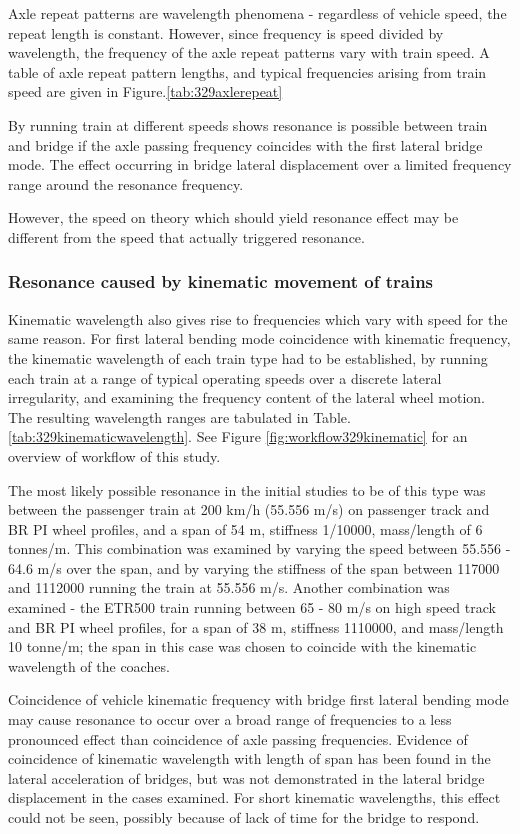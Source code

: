 Axle repeat patterns are wavelength phenomena - regardless of vehicle speed, the repeat length is constant. However, since frequency is speed divided by wavelength, the frequency of the axle repeat patterns vary with train speed. A table of axle repeat pattern lengths, and typical frequencies arising from train speed are given in Figure.\ref{tab:329axlerepeat}

By running train at different speeds shows resonance is possible between train and bridge if the axle passing frequency coincides with the first lateral bridge mode. The effect occurring in bridge lateral displacement over a limited frequency range around the resonance frequency.


However, the speed on theory which should yield resonance effect may be different from the speed that actually triggered resonance.

\subsubsection{Resonance caused by kinematic movement of trains} 
Kinematic wavelength also gives rise to frequencies which vary with speed for the same reason. For first lateral bending mode coincidence with kinematic frequency, the kinematic wavelength of each train type had to be established, by running each train at a range of typical operating speeds over a discrete lateral irregularity, and examining the frequency content of the lateral wheel motion. The resulting wavelength ranges are tabulated in Table.\ref{tab:329kinematicwavelength}. See Figure \ref{fig:workflow329kinematic} for an overview of workflow of this study.

The most likely possible resonance in the initial studies to be of this type was between the passenger train at 200 km/h (55.556 m/s) on passenger track and BR PI wheel profiles, and a span of 54 m, stiffness 1/10000, mass/length of 6 tonnes/m. This combination was examined by varying the speed between 55.556 - 64.6 m/s over the span, and by varying the stiffness of the span between 117000 and 1112000 running the train at 55.556 m/s. Another combination was examined - the ETR500 train running between 65 - 80 m/s on high speed track and BR PI wheel profiles, for a span of 38 m, stiffness 1110000, and mass/length 10 tonne/m; the span in this case was chosen to coincide with the kinematic wavelength of the coaches.

Coincidence of vehicle kinematic frequency with bridge first lateral bending mode may cause resonance to occur over a broad range of frequencies to a less pronounced effect than coincidence of axle passing frequencies. Evidence of coincidence of kinematic wavelength with length of span has been found in the lateral acceleration of bridges, but was not demonstrated in the lateral bridge displacement in the cases examined. For short kinematic wavelengths, this effect could not be seen, possibly because of lack of time for the bridge to respond.



